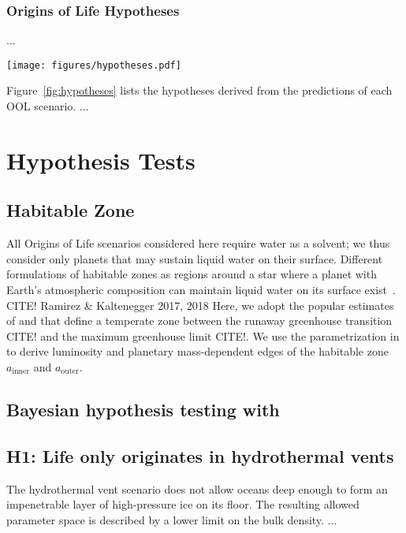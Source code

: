 \documentclass[modern,linenumbers]{aastex631}
\begin{document}
%

\subsubsection{Origins of Life Hypotheses}
...
\begin{figure*}
    \begin{centering}
        \texttt{[image: figures/hypotheses.pdf]}
        \caption{Origins of Life scenarios, their predictions on exoplanet observables, and derived population-level hypotheses.}
        \label{fig:hypotheses}
    \end{centering}
\end{figure*}
Figure~\ref{fig:hypotheses} lists the hypotheses derived from the predictions of each OOL scenario.
...


\section{Hypothesis Tests}
\label{sec:hypotests}

\subsection{Habitable Zone}
All Origins of Life scenarios considered here require water as a solvent; we thus consider only planets that may sustain liquid water on their surface.
Different formulations of habitable zones as regions around a star where a planet with Earth's atmospheric composition can maintain liquid water on its surface exist~\citep[e.g.,][]{MolLous2022,Spinelli2023,Tuchow2023}. CITE! Ramirez \& Kaltenegger 2017, 2018
Here, we adopt the popular estimates of \citet{Kasting1993} and \citet{Kopparapu2013,Kopparapu2014} that define a temperate zone between the runaway greenhouse transition CITE! and the maximum greenhouse limit CITE!.
We use the parametrization in \citet{Kopparapu2014} to derive luminosity and planetary mass-dependent edges of the habitable zone $a_\mathrm{inner}$ and $a_\mathrm{outer}$.


\subsection{Bayesian hypothesis testing with \bioverse}

\subsection{H1: Life only originates in hydrothermal vents}
The hydrothermal vent scenario does not allow oceans deep enough to form an impenetrable layer of high-pressure ice on its floor.
The resulting allowed parameter space is described by a lower limit on the bulk density. 
...
\end{document}
